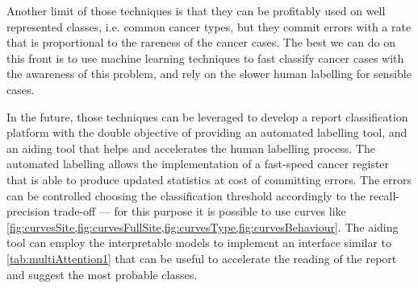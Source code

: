 Another limit of those techniques is that they can be profitably used
on well represented classes, i.e. common cancer types, but they commit
errors with a rate that is proportional to the rareness of the cancer
cases. The best we can do on this 
front is to use machine learning techniques to fast classify cancer
cases with the awareness of this problem, and rely on the slower human
labelling for sensible cases.

In the future, those techniques can be leveraged to develop a report
classification platform with the double objective of providing an
automated labelling tool, and an aiding tool that helps and
accelerates the human 
labelling process. The automated labelling allows
the implementation of a
fast-speed cancer register that is able to produce updated
statistics at cost of committing errors. The errors can be
controlled 
choosing the classification threshold accordingly to the
recall-precision trade-off --- for this purpose it is possible to use
curves like
\cref{fig:curvesSite,fig:curvesFullSite,fig:curvesType,fig:curvesBehaviour}. The 
aiding tool can employ the interpretable models to implement an
interface similar to \cref{tab:multiAttention1} that can be useful to
accelerate the reading of the report and suggest the most probable
classes.

